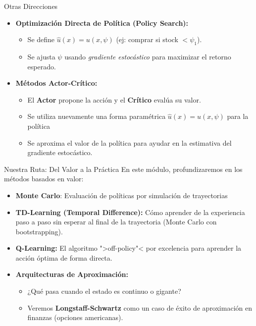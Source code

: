 \documentclass[xcolor=dvipsnames, handout]{beamer}
\begin{document}
\begin{frame}{Otras Direcciones}
\small
\begin{itemize}
    \item \textbf{Optimización Directa de Política (Policy Search):}
    \begin{itemize}
        \item Se define $\hat{u}(x) = u(x, \psi)$ (ej: comprar si stock $<\psi_1$).
        \item Se ajusta $\psi$ usando \textit{gradiente estocástico} para maximizar el retorno esperado.
    \end{itemize}
    
    \vspace{0.2cm}
    \item \textbf{Métodos Actor-Crítico:}
    \begin{itemize}
        \item El \textbf{Actor} propone la acción y el \textbf{Crítico}  evalúa su valor.
\item Se utiliza nuevamente una forma param\'etrica $\hat{u}(x) = u(x, \psi)$ para la pol\'itica
\item Se aproxima el valor de la pol\'itica para ayudar en la estimativa del gradiente estoc\'astico.
    \end{itemize}
\end{itemize}


\end{frame}

\begin{frame}{Nuestra Ruta: Del Valor a la Práctica}
En este módulo, profundizaremos en los métodos basados en valor:

\begin{itemize}
\item \textbf{Monte Carlo}: Evaluaci\'on de pol\'iticas por simulaci\'on de trayectorias
    \item<2-> \textbf{TD-Learning (Temporal Difference):} Cómo aprender de la experiencia paso a paso sin esperar al final de la trayectoria (Monte Carlo con bootstrapping).
    \item<3-> \textbf{Q-Learning:} El algoritmo ">off-policy"< por excelencia para aprender la acción óptima de forma directa.
    \item<4-> \textbf{Arquitecturas de Aproximación:} 
    \begin{itemize}
        \item ¿Qué pasa cuando el estado es continuo o gigante? 
        \item Veremos \textbf{Longstaff-Schwartz} como un caso de éxito de aproximación en finanzas (opciones americanas).
    \end{itemize}
\end{itemize}

\end{frame}
\end{document}
